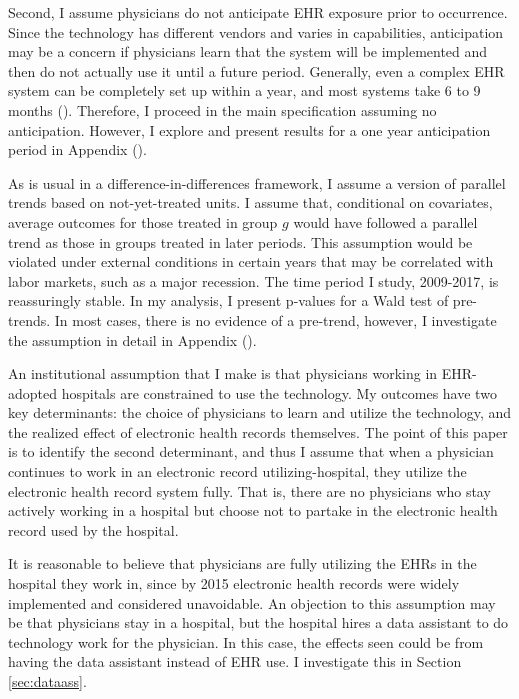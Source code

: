 \documentclass[11pt]{article}
\begin{document}
Second, I assume physicians do not anticipate EHR exposure prior to occurrence. Since the technology has different vendors and varies in capabilities, anticipation may be a concern if physicians learn that the system will be implemented and then do not actually use it until a future period. Generally, even a complex EHR system can be completely set up within a year, and most systems take 6 to 9 months (\cite{uzialko_2021}). Therefore, I proceed in the main specification assuming no anticipation. However, I explore and present results for a one year anticipation period in Appendix (). 

As is usual in a difference-in-differences framework, I assume a version of parallel trends based on not-yet-treated units. I assume that, conditional on covariates, average outcomes for those treated in group $g$ would have followed a parallel trend as those in groups treated in later periods. This assumption would be violated under external conditions in certain years that may be correlated with labor markets, such as a major recession. The time period I study, 2009-2017, is reassuringly stable. In my analysis, I present p-values for a Wald test of pre-trends. In most cases, there is no evidence of a pre-trend, however, I investigate the assumption in detail in Appendix (). 

An institutional assumption that I make is that physicians working in EHR-adopted hospitals are constrained to use the technology. My outcomes have two key determinants: the choice of physicians to learn and utilize the technology, and the realized effect of electronic health records themselves. The point of this paper is to identify the second determinant, and thus I assume that when a physician continues to work in an electronic record utilizing-hospital, they utilize the electronic health record system fully. That is, there are no physicians who stay actively working in a hospital but choose not to partake in the electronic health record used by the hospital.  

It is reasonable to believe that physicians are fully utilizing the EHRs in the hospital they work in, since by 2015 electronic health records were widely implemented and considered unavoidable. An objection to this assumption may be that physicians stay in a hospital, but the hospital hires a data assistant to do technology work for the physician. In this case, the effects seen could be from having the data assistant instead of EHR use. I investigate this in Section \ref{sec:dataass}.
\end{document}

